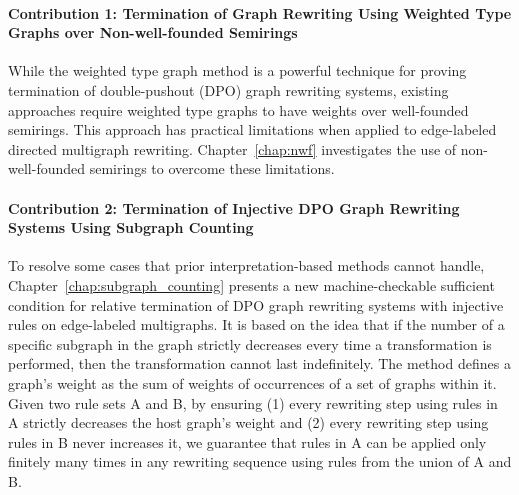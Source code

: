 \paragraph{Contribution 1: Termination of Graph Rewriting Using Weighted Type Graphs over Non-well-founded Semirings}
While the weighted type graph method is a powerful technique for proving termination of double-pushout (DPO) graph rewriting systems, existing approaches require weighted type graphs to have weights over well-founded semirings. This approach has practical limitations when applied to edge-labeled directed multigraph rewriting. Chapter~\ref{chap:nwf} investigates the use of non-well-founded semirings to overcome these limitations. 
 
\paragraph{Contribution 2: Termination of Injective DPO Graph Rewriting Systems Using Subgraph Counting} 
To resolve some cases that prior interpretation-based methods cannot handle, Chapter~\ref{chap:subgraph_counting} presents a new machine-checkable sufficient condition for relative termination of DPO graph rewriting systems with injective rules on edge-labeled multigraphs. 
It is based on the idea that if the number of a specific subgraph in the graph strictly decreases every time a transformation is performed, then the transformation cannot last indefinitely.
The method defines a graph's weight as the sum of weights of occurrences of a set of graphs within it. Given two rule sets A and B, by ensuring 
(1) every rewriting step using rules in A strictly decreases the host graph's weight and 
(2) every rewriting step using rules in B never increases it, we guarantee that rules in A can be applied only finitely many times in any rewriting sequence using rules from the union of A and B. 

